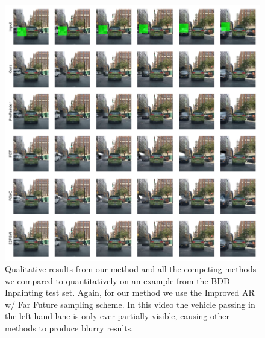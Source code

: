     
    
    \begin{figure}[t]
    \begin{center}
        \centering
        \captionsetup{type=figure}
        \includegraphics[width=\linewidth]{figures/additional-samples/taxi_all.pdf}
        \caption[Qualitative results from our method and all competing methods on an example from the BDD-Inpainting test set.]{Qualitative results from our method and all the competing methods we compared to quantitatively on an example from the BDD-Inpainting test set. Again, for our method we use the Improved AR w/ Far Future sampling scheme. In this video the vehicle passing in the left-hand lane is only ever partially visible, causing other methods to produce blurry results. }
        \label{fig:taxi}
    \end{center}
    \end{figure}

